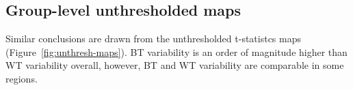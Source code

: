 \documentclass[conference]{IEEEtran}
\begin{document}
  \begin{figure}[ht]
  \end{figure}



\subsection{Group-level unthresholded maps}

Similar conclusions are drawn from the unthresholded t-statistcs maps
(Figure~\ref{fig:unthresh-maps}). BT variability is an order of magnitude
higher than WT variability overall, however, BT and WT variability are
comparable in some regions. 

\end{document}
